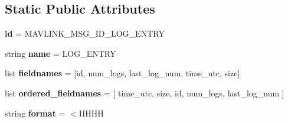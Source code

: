 \subsection*{Static Public Attributes}
\begin{DoxyCompactItemize}
\item 
\mbox{\label{classpymavlink_1_1dialects_1_1v10_1_1MAVLink__log__entry__message_a7c93d247c54be2e66fd6c0b68f3601cb}} 
{\bfseries id} = M\+A\+V\+L\+I\+N\+K\+\_\+\+M\+S\+G\+\_\+\+I\+D\+\_\+\+L\+O\+G\+\_\+\+E\+N\+T\+RY
\item 
\mbox{\label{classpymavlink_1_1dialects_1_1v10_1_1MAVLink__log__entry__message_a838820680b705b0705e55069fc1f92cf}} 
string {\bfseries name} = \textquotesingle{}L\+O\+G\+\_\+\+E\+N\+T\+RY\textquotesingle{}
\item 
\mbox{\label{classpymavlink_1_1dialects_1_1v10_1_1MAVLink__log__entry__message_a9d47f0b171bcea1883814da29f643f3c}} 
list {\bfseries fieldnames} = \mbox{[}\textquotesingle{}id\textquotesingle{}, \textquotesingle{}num\+\_\+logs\textquotesingle{}, \textquotesingle{}last\+\_\+log\+\_\+num\textquotesingle{}, \textquotesingle{}time\+\_\+utc\textquotesingle{}, \textquotesingle{}size\textquotesingle{}\mbox{]}
\item 
\mbox{\label{classpymavlink_1_1dialects_1_1v10_1_1MAVLink__log__entry__message_ab6365d3809a74b61cdb083213cb80a5a}} 
list {\bfseries ordered\+\_\+fieldnames} = \mbox{[} \textquotesingle{}time\+\_\+utc\textquotesingle{}, \textquotesingle{}size\textquotesingle{}, \textquotesingle{}id\textquotesingle{}, \textquotesingle{}num\+\_\+logs\textquotesingle{}, \textquotesingle{}last\+\_\+log\+\_\+num\textquotesingle{} \mbox{]}
\item 
\mbox{\label{classpymavlink_1_1dialects_1_1v10_1_1MAVLink__log__entry__message_aa24a13150e9a8ab8ed04df27af362e78}} 
string {\bfseries format} = \textquotesingle{}$<$I\+I\+H\+HH\textquotesingle{}
\item 
\mbox{\label{classpymavlink_1_1dialects_1_1v10_1_1MAVLink__log__entry__message_abf52703e9782283611139350835c0dca}} 

\end{DoxyCompactItemize}
